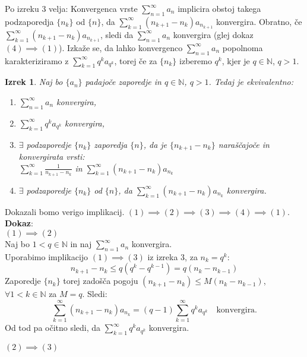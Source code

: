 \documentclass[a4paper,12pt]{article}
\def\N{\mathbb{N}} %
\newtheorem{izrek}{Izrek}
\begin{document}
Po izreku 3 velja: 
Konvergenca vrste $\sum_{n = 1}^{\infty}{a_n}$ implicira obstoj takega
podzaporedja $\{n_k\}$ od $\{n\}$, da $\sum_{k = 1}^{\infty}{(n_{k+1} - n_k)a_{n_{k + 1}}}$ konvergira.
Obratno, če $\sum_{k = 1}^{\infty}{(n_{k+1} - n_k)a_{n_{k + 1}}}$, sledi da 
$\sum_{n = 1}^{\infty}{a_n}$ konvergira (glej dokaz $(4) \implies (1)$).
Izkaže se, da lahko konvergenco $\sum_{n = 1}^{\infty}{a_n}$ popolnoma karakteriziramo
z $\sum_{k = 1}^{\infty}{q^ka_{q^k}}$, torej če za $\{n_k\}$ izberemo ${q^k}$, kjer je $q \in \N$, $q > 1$.

\begin{izrek}
    Naj bo $\{a_n\}$ padajoče zaporedje in $ q \in {\mathbb{N}}$, $q > 1$. Tedaj je ekvivalentno:
    \begin{enumerate}
        \item $\sum_{n = 1}^{\infty}{a_n}$ konvergira,
        \item $\sum_{k = 1}^{\infty}{q^ka_{q^k}}$ konvergira,
        \item $\exists$ podzaporedje $\{n_k\}$ zaporedja $\{n\}$, da je $\{n_{k+1} - n_k\}$ 
        naraščajoče in konvergirata vrsti:\\
        $\sum_{k = 1}^{\infty}{\frac{1}{n_{k+1} - n_k}}$ in 
        $\sum_{k = 1}^{\infty}{(n_{k+1} - n_k)a_{n_k}}$  
        \item $\exists$ podzaporedje $\{n_k\}$ od $\{n\}$, da $\sum_{k = 1}^{\infty}{(n_{k+1} - n_k)a_{n_k}}$ konvergira.
    \end{enumerate}
\end{izrek}   

\noindent
Dokazali bomo verigo implikacij. $ (1)\implies (2)\implies (3) \implies (4)\implies(1)$.
\noindent
\textbf{Dokaz}:\\
$(1) \implies (2)$\\
Naj bo $ 1 < q \in \N$ in naj $\sum_{n = 1}^{\infty}{a_n}$ konvergira.\\
    Uporabimo implikacijo $(1) \implies (3)$ iz izreka 3, za $n_k = q^k$:\\
    \[
        n_{k+1} - n_k \leq q(q^k - q^{k-1}) = q(n_{k} - n_{k - 1})
    \]
    Zaporedje $\{n_k\}$ torej zadošča pogoju $(n_{k+1} - n_k) \leq M(n_k - n_{k - 1})$,
    $\forall 1 < k \in \N$ za $M = q$.
    Sledi:
    \[
        \sum_{k = 1}^{\infty}{(n_{k+1} - n_k)a_{n_k}} = (q-1)\sum_{k = 1}^{\infty}{q^ka_{q^k}} 
        \quad \text{konvergira.}
    \]
    Od tod pa očitno sledi, da $\sum_{k = 1}^{\infty}{q^ka_{q^k}}$ konvergira.

\noindent
$(2) \implies (3)$\\
\end{document}
